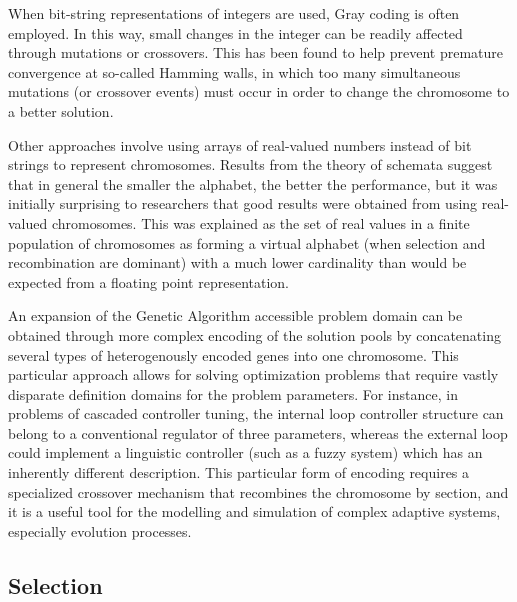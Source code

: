 When bit-string representations of integers are used, Gray coding is often employed.
In this way, small changes in the integer can be readily affected through mutations or crossovers.
This has been found to help prevent premature convergence at so-called Hamming walls,
in which too many simultaneous mutations (or crossover events) must occur in order to change 
the chromosome to a better solution.

Other approaches involve using arrays of real-valued numbers instead of bit strings to represent 
chromosomes.
Results from the theory of schemata suggest that in general the smaller the alphabet, the better
the performance, but it was initially surprising to researchers that good results were obtained 
from using real-valued chromosomes.
This was explained as the set of real values in a finite population of chromosomes as forming a 
virtual alphabet (when selection and recombination are dominant) with a much lower cardinality
than would be expected from a floating point representation.

An expansion of the Genetic Algorithm accessible problem domain can be obtained through more 
complex encoding of the solution pools by concatenating several types of heterogenously encoded 
genes into one chromosome.
This particular approach allows for solving optimization problems that require vastly disparate
definition domains for the problem parameters.
For instance, in problems of cascaded controller tuning, the internal loop controller structure
can belong to a conventional regulator of three parameters, whereas the external loop could
implement a linguistic controller (such as a fuzzy system) which has an inherently
different description.
This particular form of encoding requires a specialized crossover mechanism that recombines the
chromosome by section, and it is a useful tool for the modelling and simulation of
complex adaptive systems, especially evolution processes.

\subsection{Selection}

